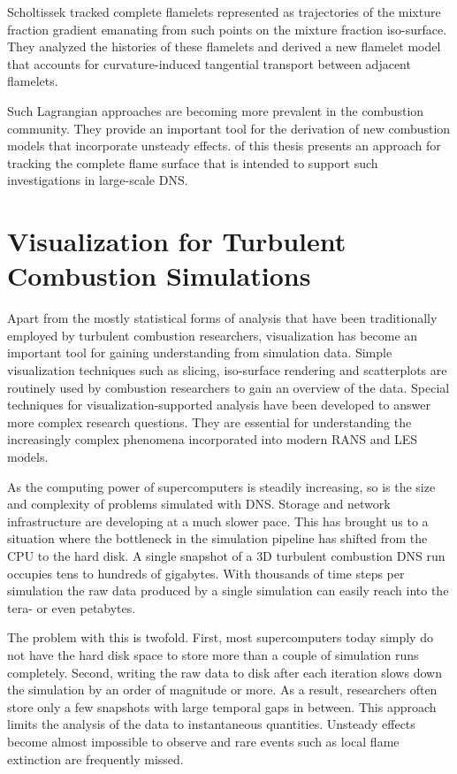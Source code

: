 %
Scholtissek \etal \cite{Scholtissek2017} tracked complete flamelets represented
as trajectories of the mixture fraction gradient emanating from such points on
the mixture fraction iso-surface.
%
They analyzed the histories of these flamelets and derived a new flamelet model
that accounts for curvature-induced tangential transport between adjacent
flamelets.
%

%
Such Lagrangian approaches are becoming more prevalent in the combustion
community.
%
They provide an important tool for the derivation of new combustion models
that incorporate unsteady effects.
%
 of this thesis presents an approach for
tracking the complete flame surface that is intended to support such
investigations in large-scale \ac{DNS}.
%
%
%
\section{Visualization for Turbulent Combustion Simulations} %
\label{sec:visualization_for_turbulent_combustion_simulations}
%
Apart from the mostly statistical forms of analysis that have been traditionally
employed by turbulent combustion researchers, visualization has become an
important tool for gaining understanding from simulation data.
%
Simple visualization techniques such as slicing, iso-surface rendering and
scatterplots are routinely used by combustion researchers to gain an overview of
the data.
%
Special techniques for visualization-supported analysis have been developed to
answer more complex research questions.
%
They are essential for understanding the increasingly complex phenomena
incorporated into modern \ac{RANS} and \ac{LES} models.
%

%
As the computing power of supercomputers is steadily increasing, so is the size
and complexity of problems simulated with \ac{DNS}.
%
Storage and network infrastructure are developing at a much slower pace.
%
This has brought us to a situation where the bottleneck in the simulation
pipeline has shifted from the \ac{CPU} to the hard disk.
%
A single snapshot of a \ac{3D} turbulent combustion \ac{DNS} run occupies tens
to hundreds of gigabytes.
%
With thousands of time steps per simulation the raw data produced by a single
simulation can easily reach into the tera- or even petabytes.
%

%
The problem with this is twofold.
%
First, most supercomputers today simply do not have the hard disk space to store
more than a couple of simulation runs completely.
%
Second, writing the raw data to disk after each iteration slows down the
simulation by an order of magnitude or more.
%
As a result, researchers often store only a few snapshots with large temporal
gaps in between.
%
This approach limits the analysis of the data to instantaneous quantities.
%
Unsteady effects become almost impossible to observe and rare events such as
local flame extinction are frequently missed.
%

